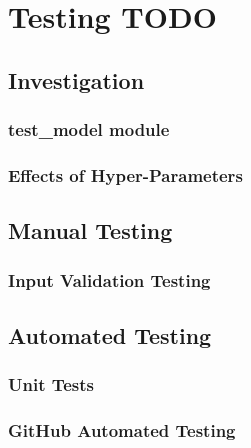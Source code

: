 \documentclass[./project-report/src/latex/project-report.tex]{subfiles}
\begin{document}
\maketitle

\section{Testing TODO}

\subsection{Investigation}

\subsubsection{test\_model module}

\subsubsection{Effects of Hyper-Parameters}

\subsection{Manual Testing}

\subsubsection{Input Validation Testing}

\subsection{Automated Testing}

\subsubsection{Unit Tests}

\subsubsection{GitHub Automated Testing}
\end{document}
